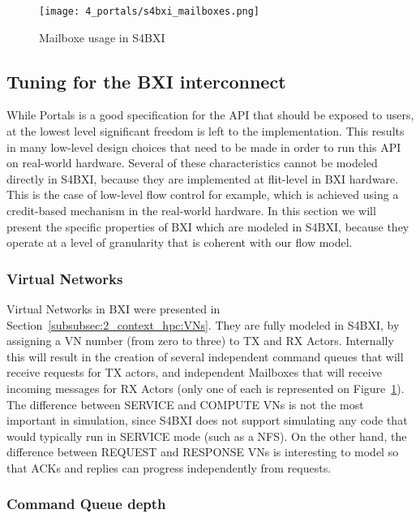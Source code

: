 \begin{figure}[!ht]
    \centering
    \texttt{[image: 4\_portals/s4bxi\_mailboxes.png]}
    \caption{Mailboxe usage in S4BXI}
    \label{fig:4_portals:s4bxi_mailboxes}
\end{figure}

\subsection{Tuning for the BXI interconnect}

While Portals is a good specification for the API that should be exposed to
users, at the lowest level significant freedom is left to the implementation.
This results in many low-level design choices that need to be made in order to
run this API on real-world hardware. Several of these characteristics cannot be
modeled directly in S4BXI, because they are implemented at flit-level in BXI
hardware. This is the case of low-level flow control for example, which is
achieved using a credit-based mechanism in the real-world hardware. In this
section we will present the specific properties of BXI which are modeled in
S4BXI, because they operate at a level of granularity that is coherent with our
flow model.

\subsubsection{Virtual Networks}

Virtual Networks in BXI were presented in
Section~\ref{subsubsec:2_context_hpc:VNs}. They are fully modeled in S4BXI, by
assigning a VN number (from zero to three) to TX and RX Actors. Internally this
will result in the creation of several independent command queues that will
receive requests for TX actors, and independent Mailboxes that will receive
incoming messages for RX Actors (only one of each is represented on
Figure~\ref{fig:4_portals:s4bxi_mailboxes}). The difference between SERVICE and
COMPUTE VNs is not the most important in simulation, since S4BXI does not
support simulating any code that would typically run in SERVICE mode (such as a
NFS). On the other hand, the difference between REQUEST and RESPONSE VNs is
interesting to model so that ACKs and replies can progress independently from
requests.

\subsubsection{Command Queue depth}

